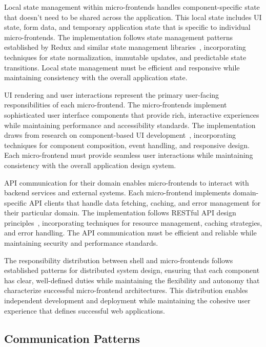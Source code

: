 \documentclass[12pt,a4paper]{report}
\begin{document}
Local state management within micro-frontends handles component-specific state that doesn't need to be shared across the application. This local state includes UI state, form data, and temporary application state that is specific to individual micro-frontends. The implementation follows state management patterns established by Redux and similar state management libraries~\cite{abramov2015redux}, incorporating techniques for state normalization, immutable updates, and predictable state transitions. Local state management must be efficient and responsive while maintaining consistency with the overall application state.

UI rendering and user interactions represent the primary user-facing responsibilities of each micro-frontend. The micro-frontends implement sophisticated user interface components that provide rich, interactive experiences while maintaining performance and accessibility standards. The implementation draws from research on component-based UI development~\cite{react2013component}, incorporating techniques for component composition, event handling, and responsive design. Each micro-frontend must provide seamless user interactions while maintaining consistency with the overall application design system.

API communication for their domain enables micro-frontends to interact with backend services and external systems. Each micro-frontend implements domain-specific API clients that handle data fetching, caching, and error management for their particular domain. The implementation follows RESTful API design principles~\cite{fielding2000architectural}, incorporating techniques for resource management, caching strategies, and error handling. The API communication must be efficient and reliable while maintaining security and performance standards.

The responsibility distribution between shell and micro-frontends follows established patterns for distributed system design, ensuring that each component has clear, well-defined duties while maintaining the flexibility and autonomy that characterize successful micro-frontend architectures. This distribution enables independent development and deployment while maintaining the cohesive user experience that defines successful web applications.

\subsection{Communication Patterns}
\end{document}
